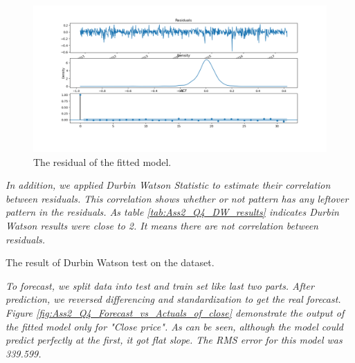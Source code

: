 \begin{figure}[H]
    \centering
    \begin{minipage}[b]{1\textwidth}
        \includegraphics[width=\textwidth]{manuscript/src/figures/Ass2/Ass2_Q4_residual_plot.png}
    \end{minipage}
    \caption{The residual of the fitted model.}
    \label{fig:Ass2_Q4_residual_plot}
\end{figure}


\textit{In addition, we applied Durbin Watson Statistic to estimate their correlation between residuals. This correlation shows whether or not pattern has any leftover pattern in the residuals. As table \ref{tab:Ass2_Q4_DW_results} indicates Durbin Watson results were close to 2. It means there are not correlation between residuals. } 

\begin{table}[H]
\centering
\caption{The result of Durbin Watson test on the dataset.}
\label{tab:Ass2_Q4_DW_results}

\end{table}




\textit{To forecast, we split data into test and train set like last two parts. After prediction, we reversed differencing and standardization to get the real forecast. Figure \ref{fig:Ass2_Q4_Forecast_vs_Actuals_of_close} demonstrate the output of the fitted model only for "Close price". As can be seen, although the model could predict perfectly at the first, it got flat slope. The RMS error for this model was 339.599.} 


